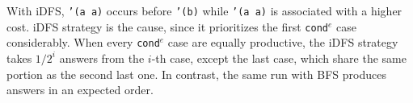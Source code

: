 \documentclass[format=acmlarge, review=true, authordraft=true]{acmart}
\newcommand{\conde}{\texttt{cond$^e$} }
\begin{document}
\begin{center}
  \begin{tabular}{c}
   
   \end{tabular}
\end{center}

With iDFS, \texttt{'(a a)} occurs before \texttt{'(b)} while \texttt{'(a a)} is 
associated with a higher cost. iDFS strategy is the cause, since it prioritizes 
the first \conde case considerably. When every \conde case 
are equally productive, the iDFS strategy takes $1/2^{i}$ answers from the 
$i$-th case, except the last case, which share the same portion as the second 
last one. In contrast, the same run with BFS produces answers in an expected 
order.

\begin{center}
  \begin{tabular}{c}
   
   \end{tabular}
\end{center}


% 
% 
% 
% 
% 
%   
 
\end{document}

